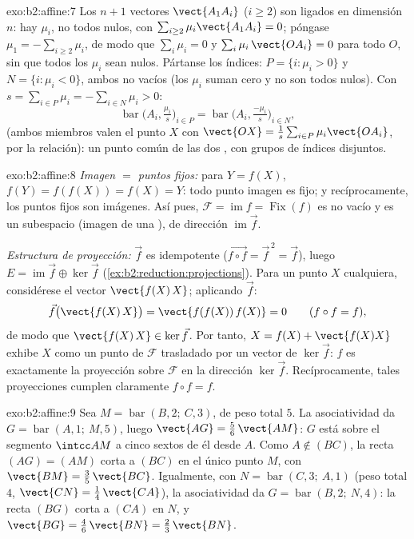 \begin{solution}{exo:b2:affine:7}
Los $n + 1$ vectores $\vect{A_1A_i}$ ($i \geq 2$) son ligados en
dimensión $n$: hay $\mu_i$, no todos nulos, con $\sum_{i\geq2}
\mu_i\vect{A_1A_i} = 0$; póngase $\mu_1 = -\sum_{i \geq 2}\mu_i$, de
modo que $\sum_{i}\mu_i = 0$ y $\sum_i \mu_i\,\vect{OA_i} = 0$ para
todo $O$, sin que todos los $\mu_i$ sean nulos. Pártanse los índices:
$P = \{i : \mu_i > 0\}$ y $N = \{i : \mu_i < 0\}$, ambos no vacíos
(los $\mu_i$ suman cero y no son todos nulos). Con $s = \sum_{i\in
P}\mu_i = -\sum_{i \in N}\mu_i > 0$:
\[
\operatorname{bar}\bigl(A_i, \tfrac{\mu_i}{s}\bigr)_{i \in P}
= \operatorname{bar}\bigl(A_i, \tfrac{-\mu_i}{s}\bigr)_{i \in N},
\]
(ambos miembros valen el punto $X$ con $\vect{OX} =
\frac1s\sum_{i\in P}\mu_i\vect{OA_i}$, por la relación): un punto
común de las dos , con grupos de índices
disjuntos.
\end{solution}

\begin{solution}{exo:b2:affine:8}
\emph{Imagen $=$ puntos fijos:} para $Y = f(X)$, $f(Y) = f(f(X)) =
f(X) = Y$: todo punto imagen es fijo; y recíprocamente, los puntos
fijos son imágenes. Así pues, $\mathcal{F} = \operatorname{im} f =
\operatorname{Fix}(f)$ es no vacío y es un subespacio  (imagen de
una ), de dirección $\operatorname{im}\vec f$.

\emph{Estructura de proyección:} $\vec f$ es idempotente ($\vec{f\circ
f} = \vec f^{\,2} = \vec f$), luego $E = \operatorname{im}\vec f
\oplus \ker \vec f$ (\cref{ex:b2:reduction:projections}). Para un
punto $X$ cualquiera, considérese el vector $\vect{f(X)\,X}$;
aplicando $\vec f$:
\[
\vec f\bigl(\vect{f(X)\,X}\bigr) = \vect{f(f(X))\,f(X)} = 0
\qquad (f \circ f = f),
\]
de modo que $\vect{f(X)\,X} \in \ker\vec f$. Por tanto, $X = f(X) +
\vect{f(X)X}$ exhibe $X$ como un punto de $\mathcal{F}$ trasladado
por un vector de $\ker\vec f$: $f$ es exactamente la proyección sobre
$\mathcal{F}$ en la dirección $\ker\vec f$. Recíprocamente, tales
proyecciones cumplen claramente $f \circ f = f$.
\end{solution}

\begin{solution}{exo:b2:affine:9}
Sea $M = \operatorname{bar}(B, 2;\ C, 3)$, de peso total $5$. La
asociatividad da $G = \operatorname{bar}(A, 1;\ M, 5)$, luego
$\vect{AG} = \frac56\,\vect{AM}$: $G$ está sobre el segmento $\intcc
AM$ a cinco sextos de él desde $A$. Como $A \notin (BC)$, la recta
$(AG) = (AM)$ corta a $(BC)$ en el único punto $M$, con $\vect{BM} =
\frac35\,\vect{BC}$. Igualmente, con $N = \operatorname{bar}(C, 3;\
A, 1)$ (peso total $4$, $\vect{CN} = \frac14\,\vect{CA}$), la
asociatividad da $G = \operatorname{bar}(B, 2;\ N, 4)$: la recta
$(BG)$ corta a $(CA)$ en $N$, y $\vect{BG} = \frac46\,\vect{BN} =
\frac23\,\vect{BN}$.
\end{solution}

